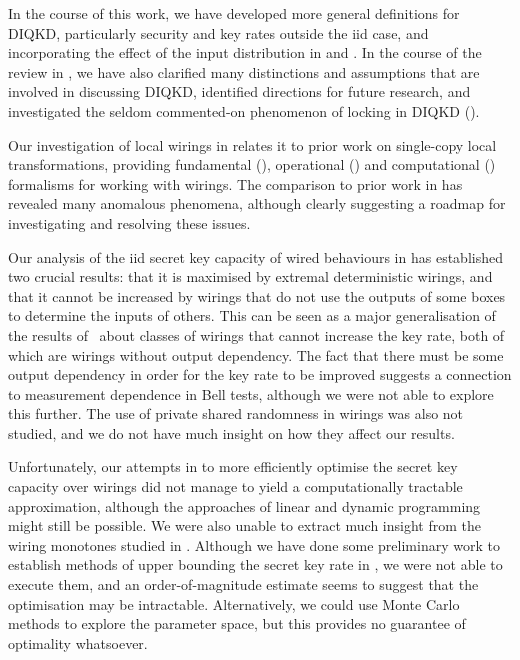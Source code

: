 \documentclass[10pt, a4paper]{article}
\numberwithin{equation}{section} %
\theoremstyle{definition}
\theoremstyle{plain}
\newcommand{\?}{\mathrel{?}} %
\begin{document}
                  In the course of this work, we have developed more general definitions for DIQKD, particularly security and key rates outside the iid case, and incorporating the effect of the input distribution in  and . In the course of the review in , we have also clarified many distinctions and assumptions that are involved in discussing DIQKD, identified directions for future research, and investigated the seldom commented-on phenomenon of locking in DIQKD ().

                  Our investigation of local wirings in  relates it to prior work on single-copy local transformations, providing fundamental (), operational () and computational () formalisms for working with wirings. The comparison to prior work in  has revealed many anomalous phenomena, although clearly suggesting a roadmap for investigating and resolving these issues.

                  Our analysis of the iid secret key capacity of wired behaviours in  has established two crucial results: that it is maximised by extremal deterministic wirings, and that it cannot be increased by wirings that do not use the outputs of some boxes to determine the inputs of others. This can be seen as a major generalisation of the results of~\cite{JanLiThesis} about classes of wirings that cannot increase the key rate, both of which are wirings without output dependency. The fact that there must be some output dependency in order for the key rate to be improved suggests a connection to measurement dependence in Bell tests, although we were not able to explore this further. The use of private shared randomness in wirings was also not studied, and we do not have much insight on how they affect our results.

                  Unfortunately, our attempts in  to more efficiently optimise the secret key capacity over wirings did not manage to yield a computationally tractable approximation, although the approaches of linear and dynamic programming might still be possible. We were also unable to extract much insight from the wiring monotones studied in . Although we have done some preliminary work to establish methods of upper bounding the secret key rate in , we were not able to execute them, and an order-of-magnitude estimate seems to suggest that the optimisation may be intractable. Alternatively, we could use Monte Carlo methods to explore the parameter space, but this provides no guarantee of optimality whatsoever.
\end{document}
